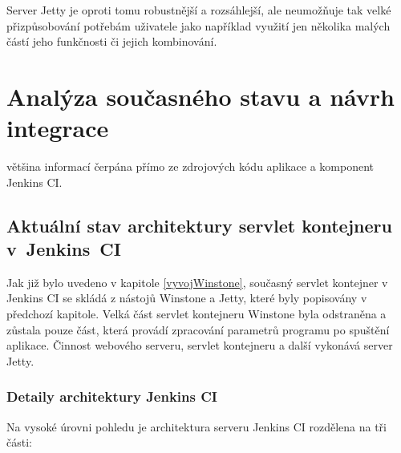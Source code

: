 \begin{itemize}
{                    Server Jetty
                    je oproti tomu robustnější a rozsáhlejší, ale neumožňuje tak velké přizpůsobování potřebám
                    uživatele jako například využití jen několika malých částí jeho funkčnosti či jejich
                    kombinování. }

            \end{itemize}
        


\chapter{Analýza současného stavu a návrh integrace}
    většina informací čerpána přímo ze zdrojových kódu aplikace a komponent Jenkins CI.
    
    \section{Aktuální stav architektury servlet kontejneru v~Jenkins~CI}
        Jak již bylo uvedeno v kapitole \ref{vyvojWinstone}, současný servlet kontejner 
        v Jenkins CI se skládá z nástojů Winstone a Jetty, které byly popisovány v 
        předchozí kapitole. Velká část servlet
        kontejneru Winstone byla odstraněna a zůstala pouze část, která
        provádí zpracování parametrů
        programu po spuštění aplikace. Činnost webového serveru, servlet kontejneru
        a další vykonává server Jetty.

        \subsection{Detaily architektury Jenkins CI}
            Na vysoké úrovni pohledu je architektura serveru Jenkins CI rozdělena na tři části:
            
